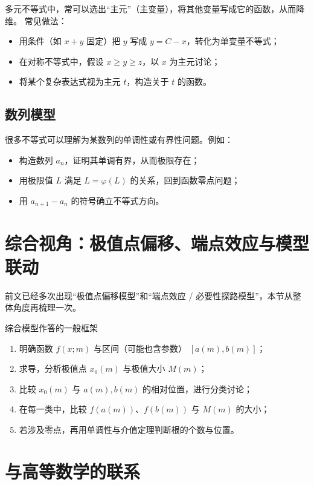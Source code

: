 \documentclass[a4paper,11pt]{ctexart}
\begin{document}
多元不等式中，常可以选出“主元”（主变量），将其他变量写成它的函数，从而降维。
常见做法：
\begin{itemize}
  \item 用条件（如 $x+y$ 固定）把 $y$ 写成 $y=C-x$，转化为单变量不等式；
  \item 在对称不等式中，假设 $x\ge y\ge z$，以 $x$ 为主元讨论；
  \item 将某个复杂表达式视为主元 $t$，构造关于 $t$ 的函数。
\end{itemize}

\subsection{数列模型}

很多不等式可以理解为某数列的单调性或有界性问题。例如：
\begin{itemize}
  \item 构造数列 $a_n$，证明其单调有界，从而极限存在；
  \item 用极限值 $L$ 满足 $L=\varphi(L)$ 的关系，回到函数零点问题；
  \item 用 $a_{n+1}-a_n$ 的符号确立不等式方向。
\end{itemize}

\section{综合视角：极值点偏移、端点效应与模型联动}

前文已经多次出现“极值点偏移模型”和“端点效应 / 必要性探路模型”，本节从整体角度再梳理一次。

\begin{summarybox}{综合模型作答的一般框架}
  \begin{enumerate}
    \item 明确函数 $f(x;m)$ 与区间（可能也含参数） $[a(m),b(m)]$；
    \item 求导，分析极值点 $x_0(m)$ 与极值大小 $M(m)$；
    \item 比较 $x_0(m)$ 与 $a(m),b(m)$ 的相对位置，进行分类讨论；
    \item 在每一类中，比较 $f(a(m))$、$f(b(m))$ 与 $M(m)$ 的大小；
    \item 若涉及零点，再用单调性与介值定理判断根的个数与位置。
  \end{enumerate}
\end{summarybox}

\section{与高等数学的联系}
\end{document}
